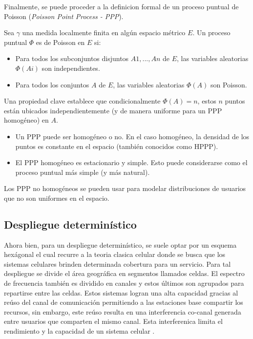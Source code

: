 Finalmente, se puede proceder a la definicion formal de un proceso puntual de Poisson (\textit{Poisson Point Process - PPP}).\newline

Sea $\gamma$ una medida localmente finita en algún espacio métrico $E$. Un proceso puntual $\Phi $ es de Poisson en $E$ si:

\begin{itemize}
    \item Para todos los subconjuntos disjuntos $A1, ..., An$ de $E$, las variables aleatorias $\Phi(Ai)$ son independientes.
    \item Para todos los conjuntos $A$ de $E$, las variables aleatorias $\Phi(A)$ son Poisson.
\end{itemize}

Una propiedad clave establece que condicionalmente $\Phi(A)= n$, estos $n$ puntos están ubicados independientemente (y de manera uniforme para un PPP homogéneo) en $A$.\newline

\begin{itemize}
    \item Un PPP puede ser homogéneo o no. En el caso homogéneo, la densidad de los puntos es constante en el espacio (también conocidos como HPPP).
    \item El PPP homogéneo es estacionario y simple. Esto puede considerarse como el proceso puntual más simple (y más natural).
\end{itemize}

Los PPP no homogéneos se pueden usar para modelar distribuciones de usuarios que no son uniformes en el espacio.


\subsection{Despliegue determinístico}

Ahora bien, para un despliegue determinístico, se suele optar por un esquema hexágonal el cual recurre a la teoria clasica celular donde se busca que los sistemas celulares brinden determinada cobertura para un servicio. Para tal despliegue se divide el área geográfica en segmentos llamados celdas. El espectro de frecuencia también es dividido en canales y estos últimos son agrupados para repartirse entre las celdas. Estos sistemas logran una alta capacidad gracias al reúso del canal de comunicación permitiendo a las estaciones base compartir los recursos, sin embargo, este reúso resulta en una interferencia co-canal generada  entre usuarios que comparten el mismo canal. Esta interferenica limita el rendimiento y la capacidad de un sistema celular \parencite{Tranter2003}. \newline

